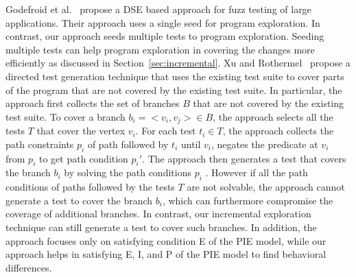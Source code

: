 

Godefroid et al.~\cite{godefroid:fuzz} propose a DSE based approach for fuzz testing of large applications. Their approach uses a single seed for program exploration. In contrast, our approach  seeds multiple tests to program exploration. Seeding multiple tests can help program exploration in covering the changes more efficiently as discussed in Section~\ref{sec:incremental}.
Xu and Rothermel~\cite{xu-directed} propose a directed test generation technique that uses 
the existing test suite to cover parts of the program that are not covered by 
the existing test suite. In particular, the approach first collects 
the set of branches $B$ that are not covered by the existing test suite. To cover a branch 
$b_i =<v_i,v_j> \in B$, the approach selects all the tests $T$ that cover the vertex $v_i$. 
For each test $t_i \in T$, the approach collects the path constraints $p_i$ of path followed by $t_i$ until $v_i$, 
negates the predicate at $v_i$ from $p_i$ to get path condition $p_i'$.
The approach then generates a test that covers the branch 
$b_i$ by solving the path conditions $p_i$ . 
However if all the path conditions of paths followed by the tests $T$ are not solvable, the approach cannot 
generate a test to cover the branch $b_i$, which can furthermore compromise the coverage of additional branches.
In contrast, our incremental exploration technique can still generate a test to cover such branches.
In addition, the approach focuses only on satisfying condition E of the PIE model, while our approach
helps in satisfying E, I, and P of the PIE model to find behavioral differences.

